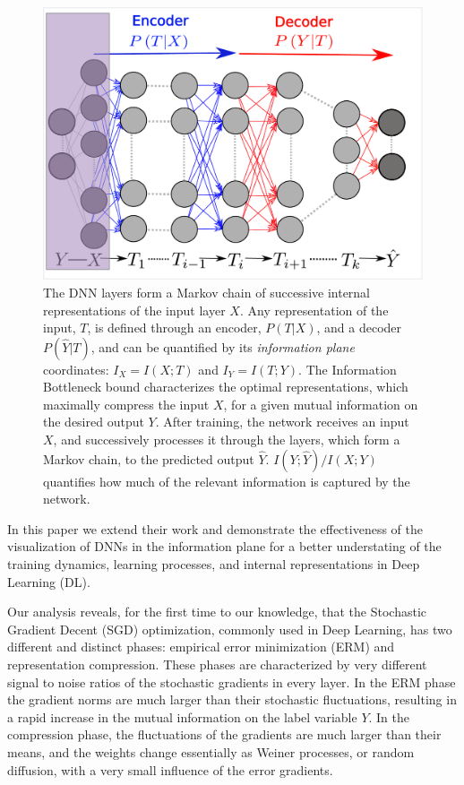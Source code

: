 \documentclass[11pt]{article}
\begin{document}
\begin{figure}[h]
\begin{centering}
\includegraphics[scale = 0.3]{Encoder-Decoder.pdf}
\par\end{centering}
\caption{The DNN layers form a Markov chain of successive internal representations of the input layer $X$. Any representation of the input, $T$, is defined through an encoder, $P(T|X)$, and a decoder $P(\hat{Y}|T)$, and can be quantified by its \emph{information plane} coordinates: $I_X= I(X;T)$ and $I_Y=I(T;Y)$. The Information Bottleneck bound characterizes the optimal representations, which maximally compress the input $X$, for a given mutual information on the desired output $Y$.   After training, the network receives an input $X$, and successively processes it through the layers, which form a Markov chain, to the predicted output $\hat{Y}$. $I(Y;\hat{Y})/I(X;Y)$ quantifies how much of the relevant information is captured by the network.
}
\label{DNN-layers}
\end{figure}



In this paper we extend their work and demonstrate the effectiveness of the 
visualization of DNNs in the information plane for a better understating of the training dynamics, 
learning processes, and internal representations in Deep Learning (DL). 

Our analysis reveals, for the first time to our knowledge, that the Stochastic Gradient Decent (SGD) optimization, commonly used  in Deep Learning, has two different and distinct phases: empirical error minimization (ERM) and representation compression. 
These phases are characterized by very different signal to noise ratios of the stochastic gradients in every layer. In the ERM phase the gradient norms are much larger than their stochastic fluctuations, resulting in a rapid increase in the mutual information on the label variable $Y$. In the compression phase, the fluctuations of the gradients are much larger than their means,  and the weights change essentially as Weiner processes, or random diffusion, with a very small influence of the error gradients. 
\end{document}
